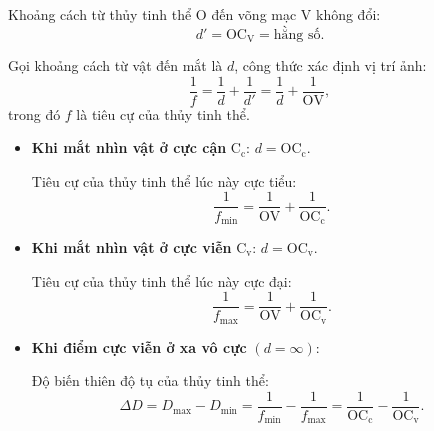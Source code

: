 Khoảng cách từ thủy tinh thể O đến võng mạc V không đổi:
$$d'=\text{OC}_\text{V}= \textrm{hằng số}.$$

Gọi khoảng cách từ vật đến mắt là $d$, công thức xác định vị trí ảnh:
$$\dfrac{1}{f}=\dfrac{1}{d}+\dfrac{1}{d'}=\dfrac{1}{d}+\dfrac{1}{\text{OV}},$$ 
trong đó $f$ là tiêu cự của thủy tinh thể.

\begin{itemize}
	\item \textbf{Khi mắt nhìn vật ở cực cận} $\text{C}_\text{c}$: $d=\text{OC}_\text{c}$.
	
	Tiêu cự của thủy tinh thể lúc này cực tiểu:
	$$\dfrac{1}{f_\text{min}}=\dfrac{1}{\text{OV}}+\dfrac{1}{\text{OC}_\text{c}}.$$
	
	\item \textbf{Khi mắt nhìn vật ở cực viễn} $\text{C}_\text{v}$: $d=\text{OC}_\text{v}$.
	
	Tiêu cự của thủy tinh thể lúc này cực đại:
	$$\dfrac{1}{f_\text{max}}=\dfrac{1}{\text{OV}}+\dfrac{1}{\text{OC}_\text{v}}.$$
	
	\item \textbf{Khi điểm cực viễn ở xa vô cực} $(d=\infty)$:
	
	Độ biến thiên độ tụ của thủy tinh thể:
	$$\Delta D= D_{\text{max}}-D_{\text{min}}=\dfrac{1}{f_\text{min}}-\dfrac{1}{f_\text{max}}=\dfrac{1}{\text{OC}_\text{c}}-\dfrac{1}{\text{OC}_\text{v}}.$$
\end{itemize}
\vspace{1em}
